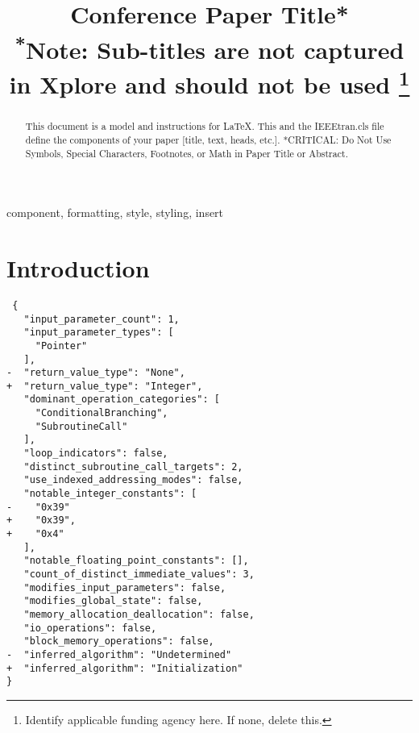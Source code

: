 \documentclass[conference,compsoc]{IEEEtran}
\begin{document}
\title{Conference Paper Title*\\
{\footnotesize \textsuperscript{*}Note: Sub-titles are not captured in Xplore and
should not be used}
\thanks{Identify applicable funding agency here. If none, delete this.}
}

\author{
\and
{}
\and
{}
}

\maketitle

\begin{abstract}
This document is a model and instructions for \LaTeX.
This and the IEEEtran.cls file define the components of your paper [title, text, heads, etc.]. *CRITICAL: Do Not Use Symbols, Special Characters, Footnotes, 
or Math in Paper Title or Abstract.
\end{abstract}

\begin{IEEEkeywords}
component, formatting, style, styling, insert
\end{IEEEkeywords}

\section{Introduction}

\begin{verbatim}
 {
   "input_parameter_count": 1,
   "input_parameter_types": [
     "Pointer"
   ],
-  "return_value_type": "None",
+  "return_value_type": "Integer",
   "dominant_operation_categories": [
     "ConditionalBranching",
     "SubroutineCall"
   ],
   "loop_indicators": false,
   "distinct_subroutine_call_targets": 2,
   "use_indexed_addressing_modes": false,
   "notable_integer_constants": [
-    "0x39"
+    "0x39",
+    "0x4"
   ],
   "notable_floating_point_constants": [],
   "count_of_distinct_immediate_values": 3,
   "modifies_input_parameters": false,
   "modifies_global_state": false,
   "memory_allocation_deallocation": false,
   "io_operations": false,
   "block_memory_operations": false,
-  "inferred_algorithm": "Undetermined"
+  "inferred_algorithm": "Initialization"
}
\end{verbatim}
\end{document}
